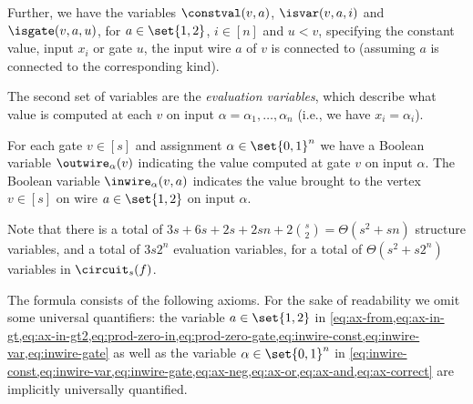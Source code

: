 Further, we have the variables $\constval(v, a)$, $\isvar(v, a, i)$
and $\isgate(v, a, u)$, for $a \in \set{1,2}$, $i \in [n]$ and
$u < v$, specifying the constant value, input $x_i$ or gate $u$, the
input wire $a$ of $v$ is connected to (assuming $a$ is connected to
the corresponding kind).

The second set of variables are the \emph{evaluation variables}, which
describe what value is computed at each $v$ on input
$\alpha = \alpha_1, \ldots, \alpha_n$ (i.e., we have $x_i = \alpha_i$).

For each gate $v \in [s]$ and assignment $\alpha \in \set{0,1}^n$ we
have a Boolean variable $\outwire_\alpha(v)$ indicating the value
computed at gate $v$ on input $\alpha$. The Boolean variable
$\inwire_{\alpha}(v, a)$ indicates the value brought to the vertex
$v \in [s]$ on wire $a \in \set{1,2}$ on input $\alpha$.

Note that there is a total of
$3s + 6s + 2s + 2sn + 2{s \choose 2} = \Theta(s^2+sn)$ structure
variables, and a total of $3 s 2^n$ evaluation variables, for a total
of $\Theta(s^2 + s 2^n)$ variables in $\circuit_s(f)$.

The formula consists of the following axioms. For the sake of
readability we omit some universal quantifiers: the variable
$a \in \set{1,2}$ in
\cref{eq:ax-from,eq:ax-in-gt,eq:ax-in-gt2,eq:prod-zero-in,eq:prod-zero-gate,eq:inwire-const,eq:inwire-var,eq:inwire-gate}
as well as the variable $\alpha \in \set{0,1}^n$ in
\cref{eq:inwire-const,eq:inwire-var,eq:inwire-gate,eq:ax-neg,eq:ax-or,eq:ax-and,eq:ax-correct}
are implicitly universally quantified.

